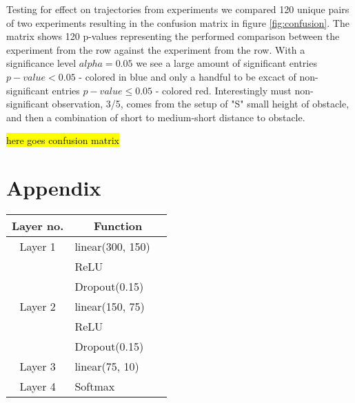 \documentclass{article}
\begin{document}
Testing for effect on trajectories from experiments we compared 120 unique pairs of two experiments resulting in the confusion matrix in figure \ref{fig:confusion}. The matrix shows 120 p-values representing the performed comparison between the experiment from the row against the experiment from the row. With a significance level $alpha = 0.05$ we see a large amount of significant entries $p-value < 0.05$ - colored in blue and only a handful to be excact of non-significant entries $p-value \leq 0.05$ - colored red. Interestingly must non-significant observation, 3/5, comes from the setup of "S" small height of obstacle, and then a combination of short to medium-short distance to obstacle.

\hl{here goes confusion matrix}
\section{Appendix}
\begin{tabular}[H]{c l @{} l}
\centering
Layer no.       &
\multicolumn{2}{c}{Function} \\
\hline
Layer 1     & linear(300, 150) \\
            & ReLU \\
            & Dropout(0.15) \\
Layer 2     & linear(150, 75) \\ 
            & ReLU \\
            & Dropout(0.15) \\
Layer 3     & linear(75, 10) \\ 
Layer 4     & Softmax\\ 
\end{tabular}\\ 
\end{document}
